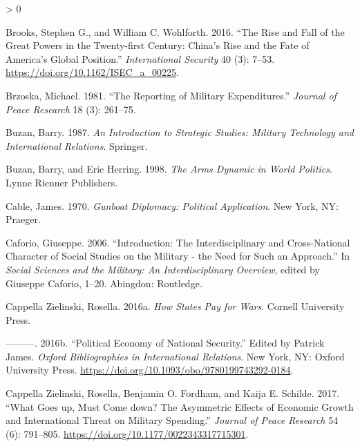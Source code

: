 \documentclass[
]{article}
\newlength{\cslhangindent}
\newenvironment{CSLReferences}[2] %
 {%
  \setlength{\parindent}{0pt}
  \ifodd #1 \everypar{\setlength{\hangindent}{\cslhangindent}}\ignorespaces\fi
  \ifnum #2 > 0
  \setlength{\parskip}{#2\baselineskip}
  \fi
 }%
 {}
\begin{document}
\begin{CSLReferences}{1}{0}
\leavevmode\hypertarget{ref-brooks_risefallgreat_2016}{}%
Brooks, Stephen G., and William C. Wohlforth. 2016. {``The {Rise} and {Fall} of the {Great Powers} in the {Twenty-first Century}: {China}'s {Rise} and the {Fate} of {America}'s {Global Position}.''} \emph{International Security} 40 (3): 7--53. \url{https://doi.org/10.1162/ISEC_a_00225}.

\leavevmode\hypertarget{ref-brzoska_reportingmilitaryexpenditures_1981}{}%
Brzoska, Michael. 1981. {``The Reporting of Military Expenditures.''} \emph{Journal of Peace Research} 18 (3): 261--75.

\leavevmode\hypertarget{ref-buzan_introductionstrategicstudies_1987}{}%
Buzan, Barry. 1987. \emph{An {Introduction} to {Strategic Studies}: {Military Technology} and {International Relations}}. {Springer}.

\leavevmode\hypertarget{ref-buzan_armsdynamicworld_1998}{}%
Buzan, Barry, and Eric Herring. 1998. \emph{The {Arms Dynamic} in {World Politics}}. {Lynne Rienner Publishers}.

\leavevmode\hypertarget{ref-cable_gunboatdiplomacypolitical_1970}{}%
Cable, James. 1970. \emph{Gunboat {Diplomacy}: {Political Application}}. {New York, NY}: {Praeger}.

\leavevmode\hypertarget{ref-caforio_introductioninterdisciplinarycrossnational_2006}{}%
Caforio, Giuseppe. 2006. {``Introduction: The Interdisciplinary and Cross-National Character of Social Studies on the Military - the Need for Such an Approach.''} In \emph{Social {Sciences} and the {Military}: {An Interdisciplinary Overview}}, edited by Giuseppe Caforio, 1--20. {Abingdon}: {Routledge}.

\leavevmode\hypertarget{ref-cappellazielinski_howstatespay_2016}{}%
Cappella Zielinski, Rosella. 2016a. \emph{How {States Pay} for {Wars}}. {Cornell University Press}.

\leavevmode\hypertarget{ref-cappellazielinski_politicaleconomynational_2016}{}%
---------. 2016b. {``Political {Economy} of {National Security}.''} Edited by Patrick James. \emph{Oxford Bibliographies in International Relations}. {New York, NY}: {Oxford University Press}. \url{https://doi.org/10.1093/obo/9780199743292-0184}.

\leavevmode\hypertarget{ref-cappellazielinski_whatgoesmust_2017}{}%
Cappella Zielinski, Rosella, Benjamin O. Fordham, and Kaija E. Schilde. 2017. {``What Goes up, Must Come down? {The} Asymmetric Effects of Economic Growth and International Threat on Military Spending.''} \emph{Journal of Peace Research} 54 (6): 791--805. \url{https://doi.org/10.1177/0022343317715301}.


\end{CSLReferences}
\end{document}
